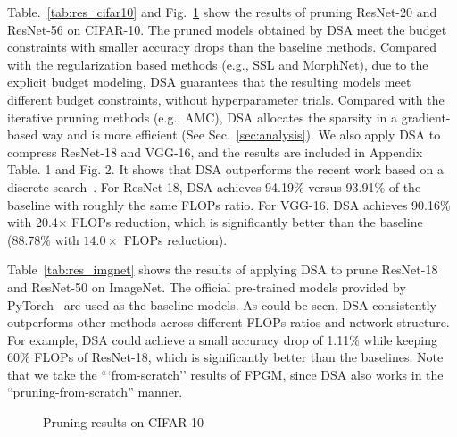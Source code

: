 \documentclass[runningheads]{llncs}
\newcommand{\dsa}{DSA\xspace}
\begin{document}
  
  Table.~\ref{tab:res_cifar10} and Fig.~\ref{fig:results_cifar10} show the results of pruning ResNet-20 and ResNet-56 on CIFAR-10. The pruned models obtained by \dsa meet the budget constraints with smaller accuracy drops than the baseline methods. 
  Compared with the regularization based methods (e.g., SSL and MorphNet), due to the explicit budget modeling, \dsa guarantees that the resulting models meet different budget constraints, without hyperparameter trials. Compared with the iterative pruning methods (e.g., AMC), DSA allocates the sparsity in a gradient-based way and is more efficient (See Sec.~\ref{sec:analysis}).
  We also apply \dsa to compress ResNet-18 and VGG-16, and the results are included in Appendix Table. 1 and Fig. 2. It shows that DSA outperforms the recent work based on a discrete search~\cite{autocompress}. For ResNet-18, \dsa achieves 94.19\% versus 93.91\% of the baseline with roughly the same FLOPs ratio. For VGG-16, \dsa achieves 90.16\% with 20.4$\times$ FLOPs reduction, which is significantly better than the baseline~\cite{autocompress} (88.78\% with $14.0\times$ FLOPs reduction).
  
  
  
  Table~\ref{tab:res_imgnet} shows the results of applying DSA to prune ResNet-18 and ResNet-50 on ImageNet. The official pre-trained models provided by PyTorch~\cite{pytorch19nips} are used as the baseline models. 
  As could be seen, DSA consistently outperforms other methods across different FLOPs ratios and network structure. For example, \dsa could achieve a small accuracy drop of 1.11\% while keeping 60\% FLOPs of ResNet-18, which is significantly better than the baselines. Note that we take the ```from-scratch'' results of FPGM, since \dsa also works in the ``pruning-from-scratch'' manner.
  
  
  
  \begin{figure}[ht]
    \centering
  \caption{Pruning results on CIFAR-10}
  \label{fig:results_cifar10}
  \end{figure}
  
\end{document}
